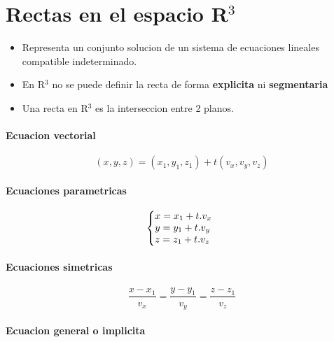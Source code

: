 \documentclass[11pt]{article}
\begin{document}
\section{Rectas en el espacio R$^3$}
\begin{itemize}
	\item Representa un conjunto solucion de un sistema de ecuaciones lineales compatible indeterminado.\\
	\item En R$^3$ no se puede definir la recta de forma \textbf{explicita} ni \textbf{segmentaria}\\
	\item Una recta en R$^3$ es la interseccion entre 2 planos.\\
\end{itemize}

\paragraph{Ecuacion vectorial}
\begin{equation*}
	(x, y, z) = (x_1, y_1, z_1) + t(v_x, v_y, v_z)
\end{equation*}

\paragraph{Ecuaciones parametricas}

\begin{equation*}
  \left\{
    \begin{array}{@{} l c @{}}
      x = x_1 +t.v_x \\
      y = y_1 +t.v_y \\
      z = z_1 +t.v_z
    \end{array}\right.
  \label{eq4}
\end{equation*}

\paragraph{Ecuaciones simetricas}

\begin{equation*}
	\dfrac{x-x_1}{v_x} = \dfrac{y-y_1}{v_y} = \dfrac{z-z_1}{v_z}
\end{equation*}

\paragraph{Ecuacion general o implicita}
\end{document}
